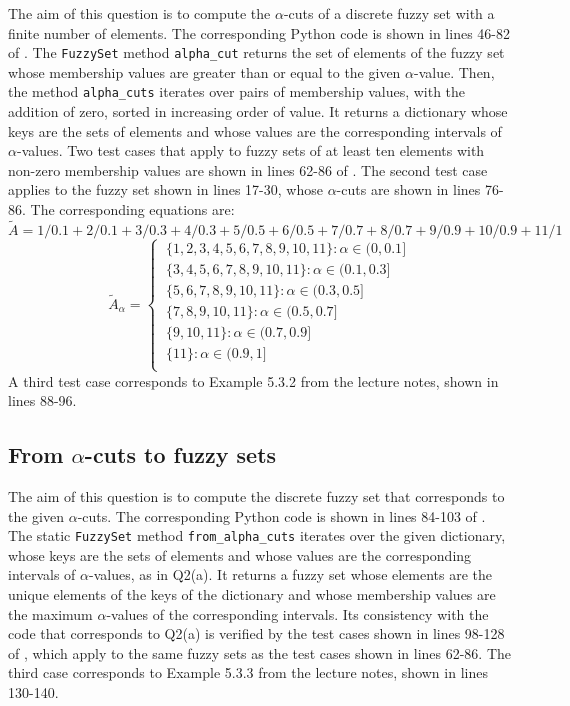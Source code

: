 The aim of this question is to compute the $\alpha$-cuts of a discrete fuzzy set with a
finite number of elements.
The corresponding Python code is shown in lines 46-82 of .
The \texttt{FuzzySet} method \texttt{alpha\_cut} returns the set of elements of the
fuzzy set whose membership values are greater than or equal to the given
$\alpha$-value.
Then, the method \texttt{alpha\_cuts} iterates over pairs of membership values, with
the addition of zero, sorted in increasing order of value.
It returns a dictionary whose keys are the sets of elements and whose values are the
corresponding intervals of $\alpha$-values.
Two test cases that apply to fuzzy sets of at least ten elements with non-zero
membership values are shown in lines 62-86 of .
The second test case applies to the fuzzy set shown in lines 17-30, whose $\alpha$-cuts
are shown in lines 76-86.
The corresponding equations are:
\begin{equation}
  \tilde{A} = 1/0.1 + 2/0.1 + 3/0.3 + 4/0.3 + 5/0.5 + 6/0.5 + 7/0.7 + 8/0.7 + 9/0.9 + 10/0.9 + 11/1
\end{equation}
\begin{equation}
  \tilde{A}_\alpha =
  \begin{cases}
    \ \{1, 2, 3, 4, 5, 6, 7, 8, 9, 10, 11\} : \alpha \in (0, 0.1]
    \\
    \ \{3, 4, 5, 6, 7, 8, 9, 10, 11\}       : \alpha \in (0.1, 0.3]
    \\
    \ \{5, 6, 7, 8, 9, 10, 11\}             : \alpha \in (0.3, 0.5]
    \\
    \ \{7, 8, 9, 10, 11\}                   : \alpha \in (0.5, 0.7]
    \\
    \ \{9, 10, 11\}                         : \alpha \in (0.7, 0.9]
    \\
    \ \{11\}                                : \alpha \in (0.9, 1]
    \\
  \end{cases}
\end{equation}
A third test case corresponds to Example 5.3.2 from the lecture notes, shown in lines
88-96.

\subsection{From $\alpha$-cuts to fuzzy sets}
\label{q2:b}

The aim of this question is to compute the discrete fuzzy set that corresponds to the
given $\alpha$-cuts.
The corresponding Python code is shown in lines 84-103 of .
The static \texttt{FuzzySet} method \texttt{from\_alpha\_cuts} iterates over the given
dictionary, whose keys are the sets of elements and whose values are the corresponding
intervals of $\alpha$-values, as in Q2(a).
It returns a fuzzy set whose elements are the unique elements of the keys of the
dictionary and whose membership values are the maximum $\alpha$-values of the
corresponding intervals.
Its consistency with the code that corresponds to Q2(a) is verified by the test cases
shown in lines 98-128 of , which apply to the same fuzzy sets as the
test cases shown in lines 62-86.
The third case corresponds to Example 5.3.3 from the lecture notes, shown in lines
130-140.

